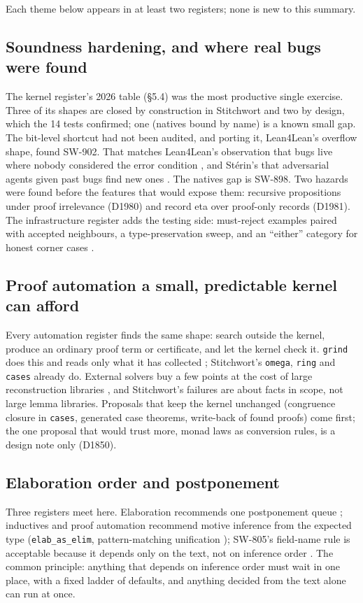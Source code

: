 \documentclass[11pt,a4paper]{article}
\newcommand{\code}[1]{\texttt{#1}}
\begin{document}
Each theme below appears in at least two registers; none is new to this summary.

\subsection{Soundness hardening, and where real bugs were found}
The kernel register's 2026 table (\S5.4) was the most productive single exercise. Three of its
shapes are closed by construction in Stitchwort and two by design, which the 14 tests confirmed;
one (natives bound by name) is a known small gap. The bit-level shortcut had not been audited,
and porting it, Lean4Lean's overflow shape, found SW-902. That matches Lean4Lean's observation
that bugs live where nobody considered the error condition \cite{carneiro2026lean4lean}, and
Stérin's that adversarial agents given past bugs find new ones \cite{sterin2026falsehood}. The
natives gap is SW-898. Two hazards were found before the
features that would expose them: recursive propositions under proof irrelevance (D1980) and
record eta over proof-only records (D1981). The infrastructure register adds the testing side:
must-reject examples paired with accepted neighbours, a type-preservation sweep, and an
``either'' category for honest corner cases \cite{leankernelarena}.

\subsection{Proof automation a small, predictable kernel can afford}
Every automation register finds the same shape: search outside the kernel, produce an ordinary
proof term or certificate, and let the kernel check it. \code{grind} does this and reads only
what it has collected \cite{lean2026grind}; Stitchwort's \code{omega}, \code{ring} and
\code{cases} already do. External solvers buy a few points at the cost of large
reconstruction libraries \cite{mohamed2025leansmt,he2026crush}, and Stitchwort's failures are
about facts in scope, not large lemma libraries. Proposals that keep the kernel unchanged
(congruence closure in \code{cases}, generated case theorems, write-back of found proofs) come
first; the one proposal that would trust more, monad laws as conversion rules, is a design note
only (D1850).

\subsection{Elaboration order and postponement}
Three registers meet here. Elaboration recommends one postponement queue
\cite{lean2026elabsrc,obrien2025omniml}; inductives and proof automation recommend motive
inference from the expected type (\code{elab\_as\_elim}, pattern-matching unification
\cite{richter2026pmu}); SW-805's field-name rule is acceptable because it depends only on the
text, not on inference order \cite{gundry2020ghc366}. The common principle: anything that depends
on inference order must wait in one place, with a fixed ladder of defaults, and anything decided
from the text alone can run at once.
\end{document}
